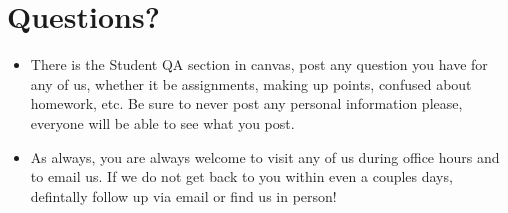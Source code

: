 \documentclass{article}
\begin{document}
\vspace{1.5cm}
\section*{Questions?}
\begin{itemize}
\item There is the Student QA section in canvas, 
    post any question you have for any of us, whether 
    it be assignments, making up points, confused 
    about homework, etc. Be sure to never post 
    any personal information please, everyone will 
    be able to see what you post.

\item As always, you are always welcome to visit any 
    of us during office hours and to email us.
    If we do not get back to you within even a couples days,
    defintally follow up via email or find us in person!
\end{itemize}
\end{document}
